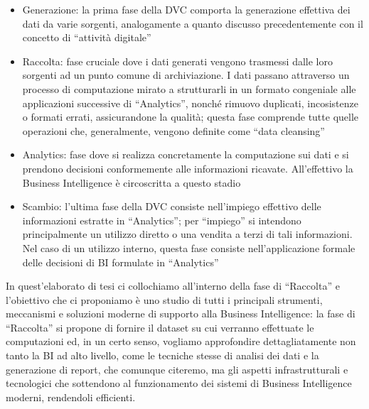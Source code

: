 \documentclass[a4paper,12pt]{report}
\begin{document}
\begin{itemize}
    \item Generazione: la prima fase della DVC comporta la generazione effettiva dei dati da varie sorgenti, analogamente a quanto discusso precedentemente con il concetto di “attività digitale”
    \item Raccolta: fase cruciale dove i dati generati vengono trasmessi dalle loro sorgenti ad un punto comune di archiviazione. I dati passano attraverso un processo di computazione mirato a strutturarli in un formato congeniale alle applicazioni successive di “Analytics”, nonché rimuovo duplicati, incosistenze o formati errati, assicurandone la qualità; questa fase comprende tutte quelle operazioni che, generalmente, vengono definite come “data cleansing”
    \item Analytics: fase dove si realizza concretamente la computazione sui dati e si prendono decisioni conformemente alle informazioni ricavate. All’effettivo la Business Intelligence è circoscritta a questo stadio
    \item Scambio: l’ultima fase della DVC consiste nell’impiego effettivo delle informazioni estratte in “Analytics”; per “impiego” si intendono principalmente un utilizzo diretto o una vendita a terzi di tali informazioni. Nel caso di un utilizzo interno, questa fase consiste nell’applicazione formale delle decisioni di BI formulate in “Analytics”
\end{itemize}

\noindent In quest’elaborato di tesi ci collochiamo all’interno della fase di “Raccolta” e l’obiettivo che ci proponiamo è uno studio di tutti i principali strumenti, meccanismi e soluzioni moderne di supporto alla Business Intelligence: la fase di “Raccolta” si propone di fornire il dataset su cui verranno effettuate le computazioni ed, in un certo senso, vogliamo approfondire dettagliatamente non tanto la BI ad alto livello, come le tecniche stesse di analisi dei dati e la generazione di report, che comunque citeremo, ma gli aspetti infrastrutturali e tecnologici che sottendono al funzionamento dei sistemi di Business Intelligence moderni, rendendoli efficienti.
\end{document}
